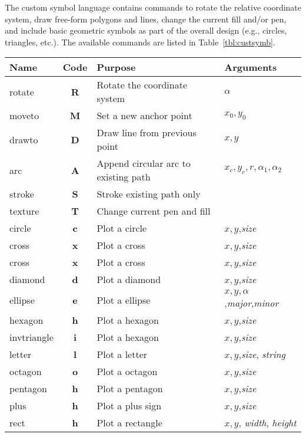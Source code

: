 The custom symbol language contains commands to rotate the relative coordinate system,
draw free-form polygons and lines, change the current fill and/or pen, and include basic
geometric symbols as part of the overall design (e.g., circles, triangles, etc.).
The available commands are listed in
Table~\ref{tbl:custsymb}.
\begin{table}[H]
\small
\centering
\begin{tabular}{|l|c|l|l|} \hline
Name 		& 	Code	&	Purpose				&	Arguments \\ \hline
rotate		&	{\bf R}	& Rotate the coordinate system		& $\alpha$ \\ \hline
moveto		&	{\bf M}	& Set a new anchor point 		& $x_0, y_0$  \\ \hline
drawto		&	{\bf D}	& Draw line from previous point 	& $x, y$  \\ \hline
arc		&	{\bf A}	& Append circular arc to existing path 	& $x_c, y_c, r, \alpha_1, \alpha_2$  \\ \hline
stroke		&	{\bf S}	& Stroke existing path only 		&  \\ \hline \hline
texture		&	{\bf T}	& Change current pen and fill		&  \\ \hline \hline
circle		&	{\bf c}	& Plot a circle 			& $x, y$,\emph{size}  \\ \hline
cross		&	{\bf x}	& Plot a cross 				& $x, y$,\emph{size}  \\ \hline
cross		&	{\bf x}	& Plot a cross 				& $x, y$,\emph{size}  \\ \hline
diamond		&	{\bf d}	& Plot a diamond 			& $x, y$,\emph{size}  \\ \hline
ellipse		&	{\bf e}	& Plot a ellipse 			& $x, y, \alpha$,\emph{major},\emph{minor}  \\ \hline
hexagon		&	{\bf h}	& Plot a hexagon 			& $x, y$,\emph{size}  \\ \hline
invtriangle	&	{\bf i}	& Plot a hexagon 			& $x, y$,\emph{size}  \\ \hline
letter		&	{\bf l}	& Plot a letter 			& $x, y$,\emph{size}, \emph{string}  \\ \hline
octagon		&	{\bf o}	& Plot a octagon 			& $x, y$,\emph{size}  \\ \hline
pentagon	&	{\bf h}	& Plot a pentagon 			& $x, y$,\emph{size}  \\ \hline
plus		&	{\bf h}	& Plot a plus sign 			& $x, y$,\emph{size}  \\ \hline
rect		&	{\bf h}	& Plot a rectangle 			& $x, y$, \emph{width}, \emph{height}  \\ \hline

\end{tabular}
\end{table}
